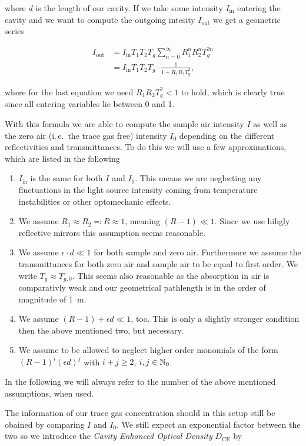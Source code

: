 where $d$ is the length of our cavity. If we take some intensity
$I_{\text{in}}$ entering the cavity and we want to compute the outgoing
intesity $I_{\text{out}}$ we get a geometric series

\begin{align*}
  I_{\text{out}} & = I_{\text{in}} T_1 T_2 T_g \sum_{n=0}^\infty R_1^n R_2^n T_g^{2n}\\
  & = I_{\text{in}} T_1 T_2 T_g \cdot \frac{1}{1 - R_1R_2T_g^2},
\end{align*}

where for the last equation we need $R_1R_2T_g^2 < 1$ to hold, which
is clearly true since all entering variables lie between 0 and 1.

With this formula we are able to compute the sample air intensity $I$
as well as the zero air (i.\,e.\ the trace gas free) intensity $I_0$
depending on the different reflectivities and transmittances. To do
this we will use a few approximations, which are listed in the
following

\begin{enumerate}
\item $I_{\text{in}}$ is the same for both $I$ and $I_0$. This means
  we are neglecting any fluctuations in the light source intensity
  coming from temperature instabilities or other optomechanic effects.
\item We assume $R_1 \approx R_2 \eqqcolon R \approx 1$, meaning $(R -
  1) \ll 1$. Since we use hihgly reflective mirrors this assumption
  seems reasonable.
\item We assume $\epsilon \cdot d \ll 1$ for both sample and zero
  air. Furthermore we assume the transmittances for both zero air and
  sample air to be equal to first order. We write $T_g \approx
  T_{g,0}$. This seems also reasonable as the absorption in air is
  comparativly weak and our geometrical pathlength is in the order of
  magnitude of \SI{1}{\meter}.
\item We assume  $(R - 1) + \epsilon d \ll 1$, too. This is only a
  slightly stronger condition then the above mentioned two, but
  necessary. 
\item We assume to be allowed to neglect higher order monomials of the
  form $(R-1)^i(\epsilon d)^j$  with $i+j \geq 2$, $i,j \in \mathbb{N}_0$.
\end{enumerate}

In the following we will always refer to the number of the above
mentioned assumptions, when used.

The information of our trace gas concentration should in this setup
still be obained by comparing $I$ and $I_0$. We still expect an
exponential factor between the two so we introduce the \emph{Cavity
  Enhanced Optical Density} $D_{\text{CE}}$ by

